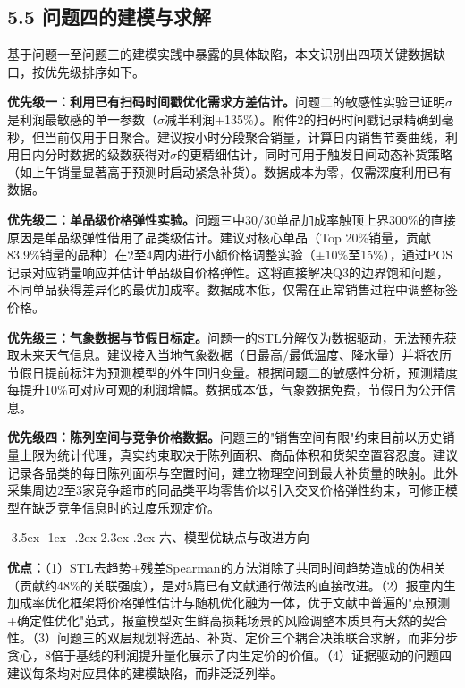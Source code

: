 \documentclass[12pt,a4paper]{article}
\makeatletter
\renewcommand{\section}{\@startsection{section}{1}{\z@}%
  {-3.5ex \@plus -1ex \@minus -.2ex}%
  {2.3ex \@plus.2ex}%
  {\centering\normalfont\Large\bfseries}}
\makeatother
\begin{document}
\subsection{5.5 问题四的建模与求解}

基于问题一至问题三的建模实践中暴露的具体缺陷，本文识别出四项关键数据缺口，按优先级排序如下。

\textbf{优先级一：利用已有扫码时间戳优化需求方差估计。}问题二的敏感性实验已证明$\sigma$是利润最敏感的单一参数（$\sigma$减半利润+135\%）。附件2的扫码时间戳记录精确到毫秒，但当前仅用于日聚合。建议按小时分段聚合销量，计算日内销售节奏曲线，利用日内分时数据的级数获得对$\sigma$的更精细估计，同时可用于触发日间动态补货策略（如上午销量显著高于预测时启动紧急补货）。数据成本为零，仅需深度利用已有数据。

\textbf{优先级二：单品级价格弹性实验。}问题三中30/30单品加成率触顶上界300\%的直接原因是单品级弹性借用了品类级估计。建议对核心单品（Top 20\%销量，贡献83.9\%销量的品种）在2至4周内进行小额价格调整实验（$\pm 10\%$至15\%），通过POS记录对应销量响应并估计单品级自价格弹性。这将直接解决Q3的边界饱和问题，不同单品获得差异化的最优加成率。数据成本低，仅需在正常销售过程中调整标签价格。

\textbf{优先级三：气象数据与节假日标定。}问题一的STL分解仅为数据驱动，无法预先获取未来天气信息。建议接入当地气象数据（日最高/最低温度、降水量）并将农历节假日提前标注为预测模型的外生回归变量。根据问题二的敏感性分析，预测精度每提升10\%可对应可观的利润增幅。数据成本低，气象数据免费，节假日为公开信息。

\textbf{优先级四：陈列空间与竞争价格数据。}问题三的"销售空间有限"约束目前以历史销量上限为统计代理，真实约束取决于陈列面积、商品体积和货架空置容忍度。建议记录各品类的每日陈列面积与空置时间，建立物理空间到最大补货量的映射。此外采集周边2至3家竞争超市的同品类平均零售价以引入交叉价格弹性约束，可修正模型在缺乏竞争信息时的过度乐观定价。

\section{六、模型优缺点与改进方向}

\textbf{优点：}（1）STL去趋势+残差Spearman的方法消除了共同时间趋势造成的伪相关（贡献约48\%的关联强度），是对5篇已有文献通行做法的直接改进。（2）报童内生加成率优化框架将价格弹性估计与随机优化融为一体，优于文献中普遍的"点预测+确定性优化"范式，报童模型对生鲜高损耗场景的风险调整本质具有天然的契合性。（3）问题三的双层规划将选品、补货、定价三个耦合决策联合求解，而非分步贪心，8倍于基线的利润提升量化展示了内生定价的价值。（4）证据驱动的问题四建议每条均对应具体的建模缺陷，而非泛泛列举。
\end{document}
